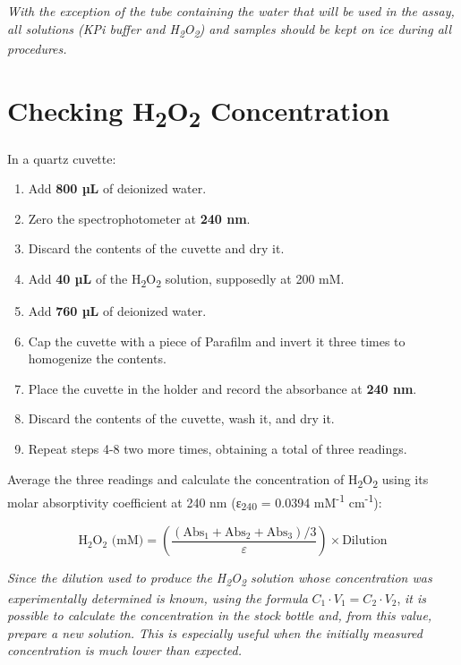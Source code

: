 \documentclass[
  9pt,
  american,
  a5paper,
  extrafontsizes,onecolumn,openright
  ]{memoir}
\providecommand{\tightlist}{%
  \setlength{\itemsep}{0pt}\setlength{\parskip}{0pt}}
\begin{document}
\begin{greybox}[frametitle = Note]
\emph{With the exception of the tube containing the water that will be used in the assay, all solutions (KPi buffer and H\textsubscript{2}O\textsubscript{2}) and samples should be kept on ice during all procedures.}

\end{greybox}

\section{\texorpdfstring{Checking H\textsubscript{2}O\textsubscript{2} Concentration}{Checking H2O2 Concentration}}\label{checking_h2o2}

In a quartz cuvette:

\begin{enumerate}
\def\labelenumi{\arabic{enumi}.}
\tightlist
\item
  Add \textbf{800 µL} of deionized water.
\item
  Zero the spectrophotometer at \textbf{240 nm}.
\item
  Discard the contents of the cuvette and dry it.
\item
  Add \textbf{40 µL} of the H\textsubscript{2}O\textsubscript{2} solution, supposedly at 200 mM.
\item
  Add \textbf{760 µL} of deionized water.
\item
  Cap the cuvette with a piece of Parafilm and invert it three times to homogenize the contents.
\item
  Place the cuvette in the holder and record the absorbance at \textbf{240 nm}.
\item
  Discard the contents of the cuvette, wash it, and dry it.
\item
  Repeat steps 4-8 two more times, obtaining a total of three readings.
\end{enumerate}

Average the three readings and calculate the concentration of H\textsubscript{2}O\textsubscript{2} using its molar absorptivity coefficient at 240 nm (ε\textsubscript{240} = 0.0394 mM\textsuperscript{-1} cm\textsuperscript{-1}):

\[\text{H}_2\text{O}_2 \text{ (mM)} = \left( \frac{\left( \text{Abs}_1 + \text{Abs}_2 + \text{Abs}_3 \right) / 3}{\varepsilon} \right) \times \text{Dilution}\]

\begin{greybox}[frametitle = Note]
\emph{Since the dilution used to produce the H\textsubscript{2}O\textsubscript{2} solution whose concentration was experimentally determined is known, using the formula} \(C_1 \cdot V_1 = C_2 \cdot V_2\), \emph{it is possible to calculate the concentration in the stock bottle and, from this value, prepare a new solution. This is especially useful when the initially measured concentration is much lower than expected.}

\end{greybox}
\end{document}
